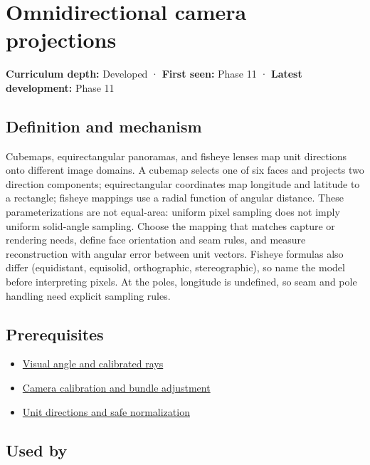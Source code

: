 \hypertarget{appendix-fc99ad39f351}{}\label{referencestart:appendix-fc99ad39f351}
\section{Omnidirectional camera projections}\label{appendix-fc99ad39f351-omnidirectional-camera-projections}

\textbf{Curriculum depth:} Developed · \textbf{First seen:} Phase 11 · \textbf{Latest development:} Phase 11

\subsection{Definition and mechanism}\label{appendix-fc99ad39f351-definition-and-mechanism}

Cubemaps, equirectangular panoramas, and fisheye lenses map unit directions onto different image domains. A cubemap selects one of six faces and projects two direction components; equirectangular coordinates map longitude and latitude to a rectangle; fisheye mappings use a radial function of angular distance. These parameterizations are not equal-area: uniform pixel sampling does not imply uniform solid-angle sampling. Choose the mapping that matches capture or rendering needs, define face orientation and seam rules, and measure reconstruction with angular error between unit vectors. Fisheye formulas also differ (equidistant, equisolid, orthographic, stereographic), so name the model before interpreting pixels. At the poles, longitude is undefined, so seam and pole handling need explicit sampling rules.

\subsection{Prerequisites}\label{appendix-fc99ad39f351-prerequisites}

\begin{itemize}
\tightlist
\item
  \hyperref[appendix-7d356c396d1a]{Visual angle and calibrated rays}
\item
  \hyperref[appendix-3ee9861904d5]{Camera calibration and bundle adjustment}
\item
  \hyperref[appendix-f744e41b95b4]{Unit directions and safe normalization}
\end{itemize}

\subsection{Used by}\label{appendix-fc99ad39f351-used-by}

